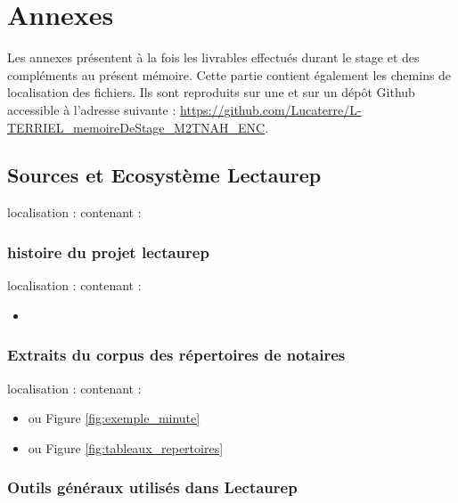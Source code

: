 

\appendix
\part*{Annexes}
\pagestyle{myheadings}

Les annexes présentent à la fois les livrables effectués durant le stage et des compléments au présent mémoire. Cette partie contient également les chemins de localisation des fichiers. Ils sont reproduits sur une  et sur un dépôt Github accessible à l'adresse suivante : \url{https://github.com/Lucaterre/L-TERRIEL_memoireDeStage_M2TNAH_ENC}.

\chapter{Sources et Ecosystème Lectaurep}

localisation :  contenant :

\section{histoire du projet lectaurep}
localisation :  contenant :
\begin{itemize}
    \item {}
\end{itemize}


\section{Extraits du corpus des répertoires de notaires}
localisation :  contenant :
\begin{itemize}
    \item {} ou Figure  \ref{fig:exemple_minute}
    \item {} ou Figure  \ref{fig:tableaux_repertoires}
\end{itemize}

\section{Outils généraux utilisés dans Lectaurep}

